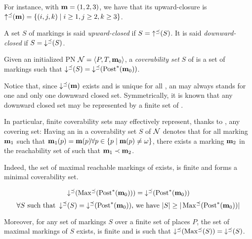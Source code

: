 For instance, with $\mathbf{m} = (1, 2, 3)$, we have that its upward-closure is $\operatorname{\uparrow^\preceq}(\mathbf{m}) = \{(i, j, k) \mid i \geq 1, j \geq 2, k \geq 3\}$.

\begin{defi}
  A set $S$ of markings is said \emph{upward-closed} if $S = \operatorname{\uparrow^\preceq}(S)$.
  It is said \emph{downward-closed} if $S = \operatorname{\downarrow^\preceq}(S)$.
\end{defi}

\begin{defi}
  Given an initialized \ac{PN} $\mathcal{N} = \langle P,T, \mathbf{m}_0\rangle$, a \emph{coverability set} $S$ of \N is a set of markings such that $\operatorname{\downarrow^\preceq}(S) = \operatorname{\downarrow^\preceq}(\operatorname{Post}^*(\mathbf{m}_0))$.
\end{defi}

Notice that, since $\operatorname{\downarrow^\preceq}(\mathbf{m})$ exists and is unique for all \omark \mar, an \omark may always stands for one and only one downward closed set.
Symmetrically, it is known that any downward closed set may be represented by a finite set of \omarks \citep{Geeraerts06}. 

In particular, finite coverability sets may effectively represent, thanks to \omarks, any covering set:
Having an \omark \mar in a coverability set $S$ of $\mathcal{N}$ denotes that for all marking $\mathbf{m}_1$ such that $\mathbf{m}_1(p) = \mathbf{m}(p) \forall p \in \{p \mid \mathbf{m}(p) \neq \omega\}$, there exists a marking $\mathbf{m}_2$ in the reachability set of \N such that $\mathbf{m}_1 \prec \mathbf{m}_2$.

Indeed, the set of maximal reachable markings of \N exists, is finite and forms a minimal coverability set.

\[\operatorname{\downarrow^\preceq}(\operatorname{Max^\preceq}(\operatorname{Post}^*(\mathbf{m}_0))) = \operatorname{\downarrow^\preceq}(\operatorname{Post}^*(\mathbf{m}_0))\]
\[\forall S \text{ such that } \operatorname{\downarrow^\preceq}(S) = \operatorname{\downarrow^\preceq}(\operatorname{Post}^*(\mathbf{m}_0))\text{, we have } |S| \geq |\operatorname{Max^\preceq}(\operatorname{Post}^*(\mathbf{m}_0))|\]

Moreover, for any set of markings $S$ over a finite set of places $P$, the set of maximal markings of $S$ exists, is finite and is such that $\operatorname{\downarrow^\preceq}(\operatorname{Max^\preceq}(S)) = \operatorname{\downarrow^\preceq}(S)$.


